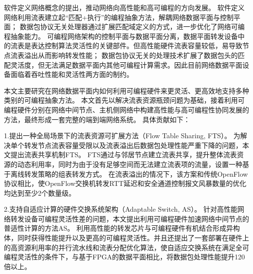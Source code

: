 
\setcounter{page}{1}

%
%
%

软件定义网络概念的提出，推动网络向高性能和高可编程的方向发展。
软件定义网络利用流表建立起“匹配+执行”的编程抽象方法，解耦网络数据平面与控制平面；
数据包协议无关处理器通过扩展匹配域定义的方式，进一步优化了网络可编程抽象能力。
可编程网络架构的控制平面与数据平面分离，数据平面转发设备中的流表是表达控制算法灵活性的关键部件。但高性能硬件流表容量较低，易导致节点流表溢出从而影响转发性能；
数据包协议无关的处理技术扩展了数据包头的匹配灵活度，但无法满足数据平面内其他可编程计算需求。因此目前网络数据平面设备面临着吞吐性能和灵活性两方面的制约。

本文主要研究在网络数据平面内如何利用可编程硬件来更灵活、更高效地支持多种类别的可编程抽象方法。
本文首先以解决流表资源瓶颈问题为基础，接着利用可编程硬件分别在网络中间节点、主机侧网络中构建高性能与高可编程性协同发展的方法，最终形成一套完整的端到端网络系统。
具体贡献如下：


1.提出一种全局场景下的流表资源可扩展方法（Flow Table Sharing, FTS）。
为解决单个转发节点流表容量受限以及流表溢出后数据包处理性能严重下降的问题，本文提出流表共享机制FTS。
FTS通过与邻居节点建立流表共享，提升整体流表资源的动态利用率，同时为由于没有足够空间而无法建立流表项的流量，设置一种基于离线转发策略的组表转发方式。
在流表溢出的情况下，该方案和传统OpenFlow协议相比，使OpenFlow交换机转发RTT延迟和安全通道控制报文风暴数量的优化均达到至少2个数量级。

2.支持自适应计算的硬件交换系统架构（Adaptable Switch, AS）。
针对高性能网络转发设备可编程灵活性差的问题，本文提出利用可编程硬件加速网络中间节点的普适性计算的方法AS。
利用高性能的转发芯片与可编程硬件有机结合形成异构体，同时获得性能提升以及更高的可编程灵活性。并且还提出了一套部署在硬件上的高资源利用率的并行流水线和流表分配优化算法，使自适应交换系统在满足全可编程灵活性的条件下，与基于FPGA的数据平面相比，将数据包处理性能提升120倍以上。

